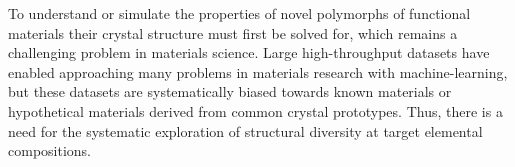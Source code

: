 %



%
%
To understand or simulate the properties of novel polymorphs of functional materials their crystal structure must first be solved for,
which remains a challenging problem in materials science.
\cite{Woodley2008,Graser2018}
%
Large high-throughput  datasets
\cite{Saal2013,Jain2013,Curtarolo2012, mamun2019high}
have enabled approaching many problems in materials research with machine-learning,
\cite{Kirklin2015}
but these datasets are systematically biased towards known materials or hypothetical materials derived from common crystal prototypes.
%
Thus, there is a need for the systematic exploration of structural diversity at target elemental compositions.


